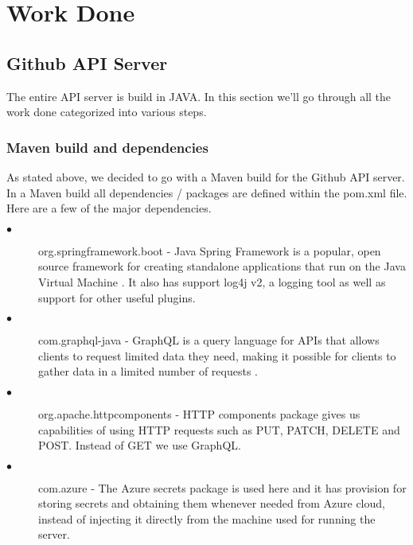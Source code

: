 
\chapter{Work Done} %

\label{ChapterX} %



\section{Github API Server}
The entire API server is build in JAVA. In this section we'll go through all the work done categorized into various steps.
\subsection{Maven build and dependencies}
As stated above, we decided to go with a Maven build for the Github API server. In a Maven build all dependencies / packages are defined within the pom.xml file. Here are a few of the major dependencies.

\begin{description}

\item[$\bullet$] org.springframework.boot - Java Spring Framework is a popular, open source framework for creating standalone applications that run on the Java Virtual Machine \cite{SpringBootIntro}. It also has support log4j v2, a logging tool as well as support for other useful plugins.

\item[$\bullet$] com.graphql-java - GraphQL is a query language for APIs that allows clients to request limited data they need, making it possible for clients to gather data in a limited number of requests \cite{GraphQLIntro}.

\item[$\bullet$] org.apache.httpcomponents - HTTP components package gives us capabilities of using HTTP requests such as PUT, PATCH, DELETE and POST. Instead of GET we use GraphQL.

\item[$\bullet$] com.azure - The Azure secrets package is used here and it has provision for storing secrets and obtaining them whenever needed from Azure cloud, instead of injecting it directly from the machine used for running the server.

\end{description}

